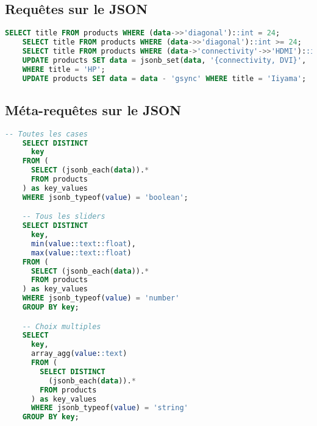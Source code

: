 \documentclass[a4paper,10pt]{article}
\begin{document}
  \subsection{Requêtes sur le JSON}
    \begin{lstlisting}[language=SQL, basicstyle=\ttfamily, gobble=4, tabsize=2, showstringspaces=false]
    SELECT title FROM products WHERE (data->>'diagonal')::int = 24;
    SELECT title FROM products WHERE (data->>'diagonal')::int >= 24;
    SELECT title FROM products WHERE (data->'connectivity'->>'HDMI')::int >= 1;
    UPDATE products SET data = jsonb_set(data, '{connectivity, DVI}', '2')
    WHERE title = 'HP';
    UPDATE products SET data = data - 'gsync' WHERE title = 'Iiyama';
    \end{lstlisting}

  \subsection{Méta-requêtes sur le JSON}
    \begin{lstlisting}[language=SQL, basicstyle=\ttfamily, gobble=4, tabsize=2, showstringspaces=false]
    -- Toutes les cases
    SELECT DISTINCT
      key
    FROM (
      SELECT (jsonb_each(data)).*
      FROM products
    ) as key_values
    WHERE jsonb_typeof(value) = 'boolean';

    -- Tous les sliders
    SELECT DISTINCT
      key,
      min(value::text::float),
      max(value::text::float)
    FROM (
      SELECT (jsonb_each(data)).*
      FROM products
    ) as key_values
    WHERE jsonb_typeof(value) = 'number'
    GROUP BY key;

    -- Choix multiples
    SELECT
      key,
      array_agg(value::text)
      FROM (
        SELECT DISTINCT
          (jsonb_each(data)).*
        FROM products
      ) as key_values
      WHERE jsonb_typeof(value) = 'string'
    GROUP BY key;
    \end{lstlisting}
\end{document}
